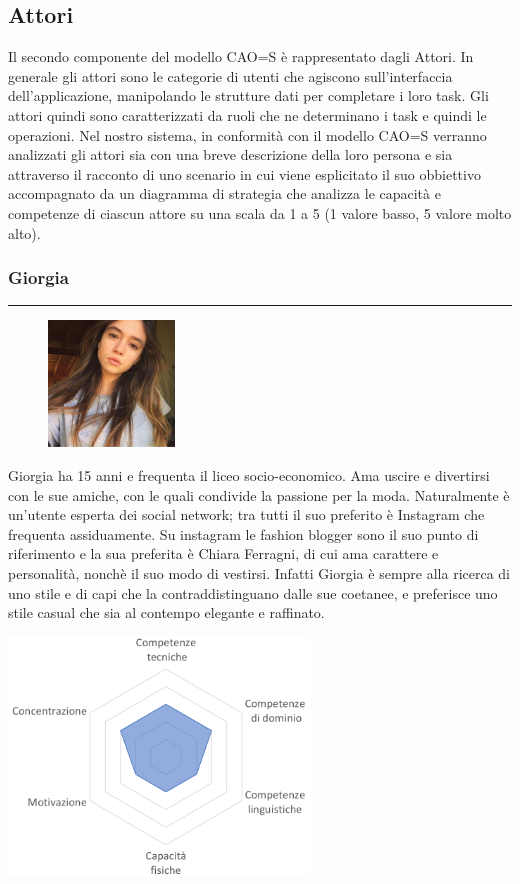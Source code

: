 \documentclass[12pt,a4paper]{report}
\begin{document}
\subsection{Attori}
Il secondo componente del modello CAO=S è rappresentato dagli Attori. In generale gli attori sono le categorie di utenti che agiscono sull'interfaccia dell'applicazione, manipolando le strutture dati per completare i loro task. Gli attori quindi sono caratterizzati da ruoli che ne determinano i task e quindi le operazioni. Nel nostro sistema, in conformità con il modello CAO=S verranno analizzati gli attori sia con una breve descrizione della loro persona e sia attraverso il racconto di uno scenario in cui viene esplicitato il suo obbiettivo accompagnato da un diagramma di strategia che analizza le capacità e competenze di ciascun attore su una scala da 1 a 5 (1 valore basso, 5 valore molto alto).\\

\subsubsection{Giorgia}
\rule{\textwidth}{0.5pt}
\begin{figure}
  \centering
    \includegraphics[width=0.3\textwidth]{"Images Latex/Personas/Giorgia"}
\end{figure}
  Giorgia ha 15 anni e frequenta il liceo socio-economico. Ama uscire e divertirsi con le sue amiche, con le quali condivide la passione per la moda. Naturalmente è un'utente esperta dei social network; tra tutti il suo preferito è Instagram che frequenta assiduamente. Su instagram le fashion blogger sono il suo punto di riferimento e la sua preferita è Chiara Ferragni, di cui ama carattere e personalità, nonchè il suo modo di vestirsi. Infatti Giorgia è sempre alla ricerca di uno stile e di capi che la contraddistinguano dalle sue coetanee, e preferisce uno stile casual che sia al contempo elegante e raffinato.\\
  \begin{center}
    \includegraphics[width=0.6\textwidth]{"Images Latex/Personas/Giorgia15"}
  \end{center}
\newpage
\end{document}
